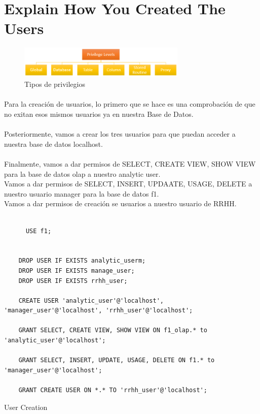 \documentclass[a4paper 
,twoside
]{article}
\begin{document}
\section{Explain How You Created The Users}
  \begin{figure}[H]
    \centering
    \includegraphics[width=8cm]{privilege.png}
    \caption{Tipos de privilegios}
  \end{figure}
  \paragraph{}
  Para la creación de usuarios, lo primero que se hace es una comprobación de que no exitan esos mismos usuarios ya en nuestra Base de Datos.

  \paragraph{}
  Posteriormente, vamos a crear los tres usuarios para que puedan acceder a nuestra base de datos localhost.

  \paragraph{}
  Finalmente, vamos a dar permisos de SELECT, CREATE VIEW, SHOW VIEW para la base de datos olap a nuestro analytic user.\\ Vamos a dar permisos de SELECT, INSERT, UPDAATE, USAGE, DELETE  a nuestro usuario manager para la base de datos f1.\\Vamos a dar permisos de creación se usuarios a nuestro usuario de RRHH.



  \begin{listing}[H]
    \begin{verbatim}

      USE f1;


    DROP USER IF EXISTS analytic_userm;
    DROP USER IF EXISTS manage_user;
    DROP USER IF EXISTS rrhh_user;

    CREATE USER 'analytic_user'@'localhost', 'manager_user'@'localhost', 'rrhh_user'@'localhost';

    GRANT SELECT, CREATE VIEW, SHOW VIEW ON f1_olap.* to 'analytic_user'@'localhost';

    GRANT SELECT, INSERT, UPDATE, USAGE, DELETE ON f1.* to 'manager_user'@'localhost';  

    GRANT CREATE USER ON *.* TO 'rrhh_user'@'localhost';

    \end{verbatim}
    \caption{User Creation}
    \label{lst:users}
  \end{listing}
\end{document}
